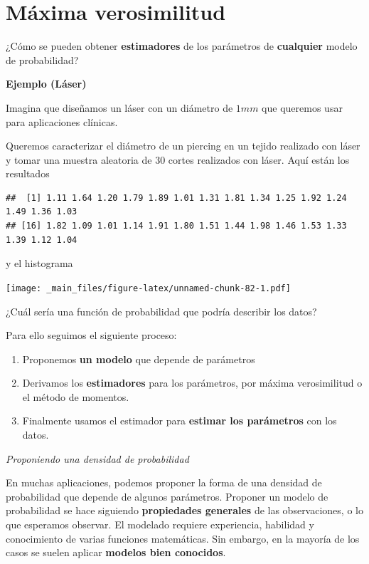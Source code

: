 \documentclass[
]{book}
\providecommand{\tightlist}{%
  \setlength{\itemsep}{0pt}\setlength{\parskip}{0pt}}
\begin{document}
\hypertarget{muxe1xima-verosimilitud}{%
\section{Máxima verosimilitud}\label{muxe1xima-verosimilitud}}

¿Cómo se pueden obtener \textbf{estimadores} de los parámetros de \textbf{cualquier} modelo de probabilidad?

\textbf{Ejemplo (Láser)}

Imagina que diseñamos un láser con un diámetro de \(1 mm\) que queremos usar para aplicaciones clínicas.

Queremos caracterizar el diámetro de un piercing en un tejido realizado con láser y tomar una muestra aleatoria de \(30\) cortes realizados con láser. Aquí están los resultados

\begin{verbatim}
##  [1] 1.11 1.64 1.20 1.79 1.89 1.01 1.31 1.81 1.34 1.25 1.92 1.24 1.49 1.36 1.03
## [16] 1.82 1.09 1.01 1.14 1.91 1.80 1.51 1.44 1.98 1.46 1.53 1.33 1.39 1.12 1.04
\end{verbatim}

y el histograma

\texttt{[image: \_main\_files/figure-latex/unnamed-chunk-82-1.pdf]}

¿Cuál sería una función de probabilidad que podría describir los datos?

Para ello seguimos el siguiente proceso:

\begin{enumerate}
\def\labelenumi{\arabic{enumi}.}
\tightlist
\item
  Proponemos \textbf{un modelo} que depende de parámetros
\item
  Derivamos los \textbf{estimadores} para los parámetros, por máxima verosimilitud o el método de momentos.
\item
  Finalmente usamos el estimador para \textbf{estimar los parámetros} con los datos.
\end{enumerate}

\emph{Proponiendo una densidad de probabilidad}

En muchas aplicaciones, podemos proponer la forma de una densidad de probabilidad que depende de algunos parámetros. Proponer un modelo de probabilidad se hace siguiendo \textbf{propiedades generales} de las observaciones, o lo que esperamos observar. El modelado requiere experiencia, habilidad y conocimiento de varias funciones matemáticas. Sin embargo, en la mayoría de los casos se suelen aplicar \textbf{modelos bien conocidos}.
\end{document}

